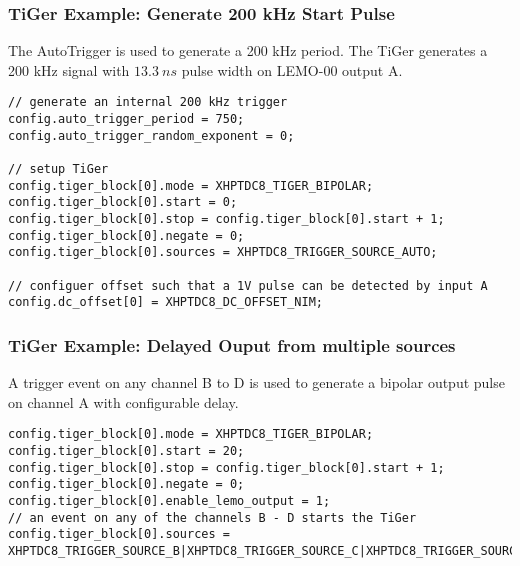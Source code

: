 \subsubsection{TiGer Example: Generate 200 kHz Start Pulse}
The AutoTrigger is used to generate a 200 kHz period. 
The TiGer generates a 200 kHz signal with $13.3 ~ns$ pulse width on LEMO-00 output A.
\begin{lstlisting}[frame=tlrb]
// generate an internal 200 kHz trigger
config.auto_trigger_period = 750;
config.auto_trigger_random_exponent = 0;

// setup TiGer 
config.tiger_block[0].mode = XHPTDC8_TIGER_BIPOLAR;
config.tiger_block[0].start = 0;
config.tiger_block[0].stop = config.tiger_block[0].start + 1;
config.tiger_block[0].negate = 0;
config.tiger_block[0].sources = XHPTDC8_TRIGGER_SOURCE_AUTO;

// configuer offset such that a 1V pulse can be detected by input A 
config.dc_offset[0] = XHPTDC8_DC_OFFSET_NIM; 
\end{lstlisting}

\subsubsection{TiGer Example: Delayed Ouput from multiple sources}
A trigger event on any channel B to D is used to generate a bipolar output pulse on channel A with configurable delay. 
\begin{lstlisting}[frame=tlrb]
config.tiger_block[0].mode = XHPTDC8_TIGER_BIPOLAR;
config.tiger_block[0].start = 20;
config.tiger_block[0].stop = config.tiger_block[0].start + 1;
config.tiger_block[0].negate = 0;
config.tiger_block[0].enable_lemo_output = 1;
// an event on any of the channels B - D starts the TiGer 
config.tiger_block[0].sources = XHPTDC8_TRIGGER_SOURCE_B|XHPTDC8_TRIGGER_SOURCE_C|XHPTDC8_TRIGGER_SOURCE_D;
\end{lstlisting}
